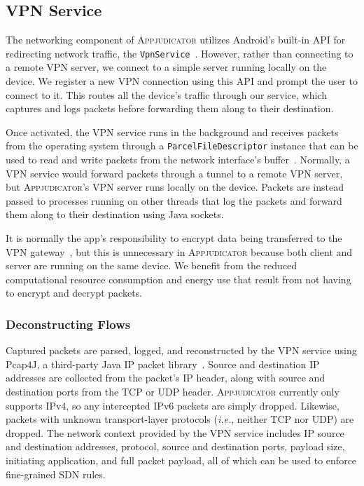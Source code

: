 \subsection{VPN Service}
\label{sec:implementation-vpn-service}

The networking component of \textsc{Appjudicator} utilizes Android's built-in
API for redirecting network traffic, the
\texttt{VpnService}~\cite{googledevelopers2020vpn}. However, rather than
connecting to a remote VPN server, we connect to a simple server running locally
on the device. We register a new VPN connection using this API and prompt the
user to connect to it. This routes all the device's traffic through our service,
which captures and logs packets before forwarding them along to their
destination.

Once activated, the VPN service runs in the background and receives packets from
the operating system through a \texttt{ParcelFileDescriptor} instance that can
be used to read and write packets from the network interface's
buffer~\cite{vpnguide}.  Normally, a VPN service would forward packets through a
tunnel to a remote VPN server, but \textsc{Appjudicator}'s VPN server runs
locally on the device.  Packets are instead passed to processes running on other
threads that log the packets and forward them along to their destination using
Java sockets.

It is normally the app's responsibility to encrypt data being transferred to the
VPN gateway~\cite{vpnguide}, but this is unnecessary in \textsc{Appjudicator}
because both client and server are running on the same device. We benefit from
the reduced computational resource consumption and energy use that result from
not having to encrypt and decrypt packets.

\subsubsection{Deconstructing Flows}
\label{sec:deconstructing-flows}

Captured packets are parsed, logged, and reconstructed by the VPN service using
Pcap4J, a third-party Java IP packet library~\cite{kaito2016}. Source and
destination IP addresses are collected from the packet's IP header, along with
source and destination ports from the TCP or UDP header. \textsc{Appjudicator}
currently only supports IPv4, so any intercepted IPv6 packets are simply
dropped. Likewise, packets with unknown transport-layer protocols
(\textit{i.e.}, neither TCP nor UDP) are dropped. The network context provided
by the VPN service includes IP source and destination addresses, protocol,
source and destination ports, payload size, initiating application, and full
packet payload, all of which can be used to enforce fine-grained SDN rules.

